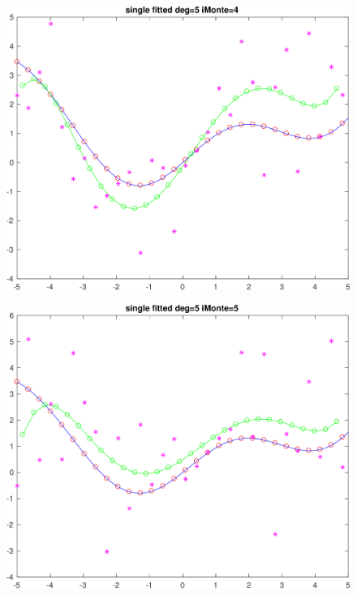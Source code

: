 \documentclass[11pt]{article}
\begin{document}
\begin{figure}[h!]
\centering\includegraphics[scale=0.1]{single_poly_d_5_iMonte_4.png}
\end{figure}


\begin{figure}[h!]
\centering\includegraphics[scale=0.1]{single_poly_d_5_iMonte_5.png}
\end{figure}
\end{document}
